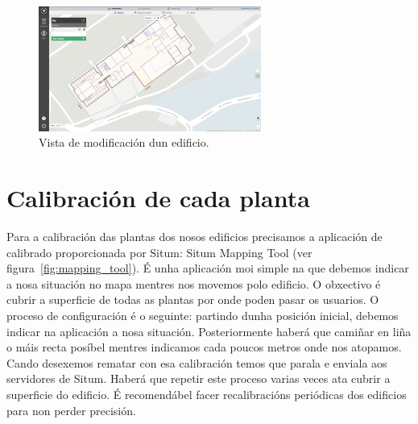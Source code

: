 \begin{figure}[tbh] 
	\begin{center}
		\includegraphics[width=0.65\textwidth]{figures/Capturas/edificio}
		\caption{Vista de modificación dun edificio.}
		\label{fig:edificio}
	\end{center}
\end{figure}

\section{Calibración de cada planta}
Para a calibración das plantas dos nosos edificios precisamos a aplicación de calibrado proporcionada por Situm: Situm Mapping Tool (ver figura~\ref{fig:mapping_tool}). É unha aplicación moi simple na que debemos indicar a nosa situación no mapa mentres nos movemos polo edificio. O obxectivo é cubrir a superficie de todas as plantas por onde poden pasar os usuarios.
O proceso de configuración é o seguinte: partindo dunha posición inicial, debemos indicar na aplicación a nosa situación. Posteriormente haberá que camiñar en liña o máis recta posíbel mentres indicamos cada poucos metros onde nos atopamos. Cando desexemos rematar con esa calibración temos que parala e enviala aos servidores de Situm. Haberá que repetir este proceso varias veces ata cubrir a superficie do edificio.
É recomendábel facer recalibracións periódicas dos edificios para non perder precisión.

